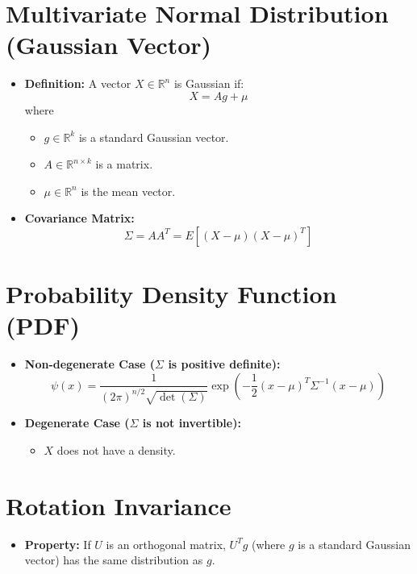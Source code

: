 \documentclass{article}
\begin{document}
\section*{Multivariate Normal Distribution (Gaussian Vector)}
\begin{itemize}
    \item \textbf{Definition:} A vector $X \in \mathbb{R}^n$ is Gaussian if:
    \[
    X = A g + \mu
    \]
    where
    \begin{itemize}
        \item $g \in \mathbb{R}^k$ is a standard Gaussian vector.
        \item $A \in \mathbb{R}^{n \times k}$ is a matrix.
        \item $\mu \in \mathbb{R}^n$ is the mean vector.
    \end{itemize}
    
    \item \textbf{Covariance Matrix:}
    \[
    \Sigma = A A^T = E[(X - \mu)(X - \mu)^T]
    \]
\end{itemize}

\section*{Probability Density Function (PDF)}
\begin{itemize}
    \item \textbf{Non-degenerate Case ($\Sigma$ is positive definite):}
    \[
    \psi(x) = \frac{1}{(2\pi)^{n/2} \sqrt{\det(\Sigma)}} \exp\left(-\frac{1}{2} (x - \mu)^T \Sigma^{-1} (x - \mu)\right)
    \]
    
    \item \textbf{Degenerate Case ($\Sigma$ is not invertible):}
    \begin{itemize}
        \item $X$ does not have a density.
    \end{itemize}
\end{itemize}

\section*{Rotation Invariance}
\begin{itemize}
    \item \textbf{Property:} If $U$ is an orthogonal matrix, $U^T g$ (where $g$ is a standard Gaussian vector) has the same distribution as $g$.
\end{itemize}
\end{document}
